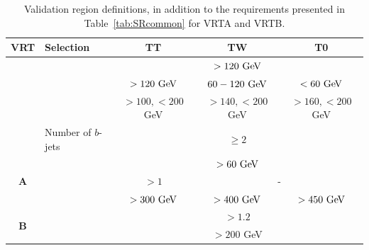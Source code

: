 		\begin{table}[htb]
		  \caption{Validation region definitions, in addition to the requirements presented in Table~\ref{tab:SRcommon} for VRTA and VRTB.}
		  \begin{center}
		    \def\arraystretch{1.4}%
		    \begin{tabular}{clccc} \toprule
		      {\textbf{VRT}}             & \textbf{Selection} & {\textbf{TT}}     & {\textbf{TW}}     & {\textbf{T0}}     \\ \toprule
		                                 & \mantikttwelvezero & \multicolumn{3}{c}{$>120\gev$}             \\ %
		                                 & \mantikttwelveone  & $>120\gev$   & $60-120\gev$ & $<60\gev$    \\ %
		                                 & \mtbmin            & $>100,<200$ GeV & $>140,<200$ GeV & $>160,<200$ GeV       \\ %
		                                 & Number of $b$-jets & \multicolumn{3}{c}{ $\geq 2$  }            \\ %
		      \midrule
		      \multirow{3}{*}{{\textbf{A}}}   & \mantikteightzero  & \multicolumn{3}{c}{$>60\gev$}              \\ %
		      & \drbjetbjet        & $>1$         & \multicolumn{2}{c}{-}       \\ %
		                                 & \met               & $> 300 \gev$ & $> 400 \gev$ & $> 450 \gev$ \\ \midrule
		      \multirow{2}{*}{{\textbf{B}}}   & \drbjetbjet           & \multicolumn{3}{c}{$>1.2$}             \\ %
		       & \mtbmax           & \multicolumn{3}{c}{$>200$ GeV}             \\ %
		      \toprule
		    \end{tabular}
		  \end{center}
		  \label{tab:VRTABDef}
		\end{table}%

